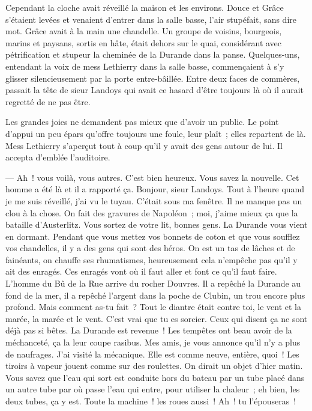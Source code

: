 \documentclass[french,twoside]{book} %
\begin{document}
Cependant la cloche avait réveillé la maison et les environs. Douce et Grâce s’étaient levées et venaient d’entrer dans la salle basse, l’air stupéfait, sans dire mot. Grâce avait à la main une chandelle. Un groupe  de voisins, bourgeois, marins et paysans, sortis en hâte, était dehors sur le quai, considérant avec pétrification et stupeur la cheminée de la Durande dans la panse. Quelques-uns, entendant la voix de mess Lethierry dans la salle basse, commençaient à s’y glisser silencieusement par la porte entre-bâillée. Entre deux faces de commères, passait la tête de sieur Landoys qui avait ce hasard d’être toujours là où il aurait regretté de ne pas être.\par
Les grandes joies ne demandent pas mieux que d’avoir un public. Le point d’appui un peu épars qu’offre toujours une foule, leur plaît ; elles repartent de là. Mess Lethierry s’aperçut tout à coup qu’il y avait des gens autour de lui. Il accepta d’emblée l’auditoire.\par
— Ah ! vous voilà, vous autres. C’est bien heureux. Vous savez la nouvelle. Cet homme a été là et il a rapporté ça. Bonjour, sieur Landoys. Tout à l’heure quand je me suis réveillé, j’ai vu le tuyau. C’était sous ma fenêtre. Il ne manque pas un clou à la chose. On fait des gravures de Napoléon ; moi, j’aime mieux ça que la bataille d’Austerlitz. Vous sortez de votre lit, bonnes gens. La Durande vous vient en dormant. Pendant que vous mettez vos bonnets de coton et que vous soufflez vos chandelles, il y a des gens qui sont des héros. On est un tas de lâches et de fainéants, on chauffe ses rhumatismes, heureusement cela n’empêche pas qu’il y ait des enragés. Ces enragés vont où il faut aller et font ce qu’il faut faire. L’homme du Bû de la Rue arrive du rocher Douvres. Il a repêché la Durande au fond de  la mer, il a repêché l’argent dans la poche de Clubin, un trou encore plus profond. Mais comment as-tu fait ? Tout le diantre était contre toi, le vent et la marée, la marée et le vent. C’est vrai que tu es sorcier. Ceux qui disent ça ne sont déjà pas si bêtes. La Durande est revenue ! Les tempêtes ont beau avoir de la méchanceté, ça la leur coupe rasibus. Mes amis, je vous annonce qu’il n’y a plus de naufrages. J’ai visité la mécanique. Elle est comme neuve, entière, quoi ! Les tiroirs à vapeur jouent comme sur des roulettes. On dirait un objet d’hier matin. Vous savez que l’eau qui sort est conduite hors du bateau par un tube placé dans un autre tube par où passe l’eau qui entre, pour utiliser la chaleur ; eh bien, les deux tubes, ça y est. Toute la machine ! les roues aussi ! Ah ! tu l’épouseras !\par
\end{document}
